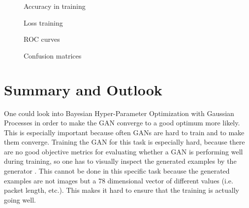 \documentclass[]{article}
\begin{document}
	\begin{figure}[!tbp]
		\centering
		\hfill
		\caption{Accuracy in training}
		\label{accuracy}
	\end{figure}
	
	\begin{figure}[!tbp]
		\centering
		\hfill
		\hfill
		\caption{Loss training}
		\label{loss}
	\end{figure}

	\begin{figure}[!tbp]
		\centering
		\hfill
		\hfill
		\caption{ROC curves}
		\label{roc}
	\end{figure}

	\begin{figure}[!tbp]
	\centering
	\hfill
	\hfill
	\caption{Confusion matrices}
	\label{confusion}
\end{figure}

	\section{Summary and Outlook}
	
	One could look into Bayesian Hyper-Parameter Optimization with Gaussian Processes in order to make the GAN converge to a good optimum more likely. This is especially important because often GANs are hard to train and to make them converge. Training the GAN for this task is especially hard, because there are no good objective metrics for evaluating whether a GAN is performing well during training, so one has to visually inspect the generated examples by the generator \cite{https://doi.org/10.48550/arxiv.1606.03498}. This cannot be done in this specific task because the generated examples are not images but a 78 dimensional vector of different values (i.e. packet length, etc.). This makes it hard to ensure that the training is actually going well. 
	
\end{document}

